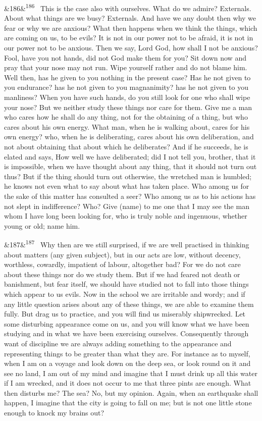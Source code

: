 \documentclass[12pt]{article}
\newcommand{\para}[1][]{\par\noindent\ifx&#1&\else\textsuperscript{\footnotesize #1}~\fi}
\begin{document}
\para[186] This is the case also with ourselves. What do we admire? Externals. About what things are we busy? Externals. And have we any doubt then why we fear or why we are anxious? What then happens when we think the things, which are coming on us, to be evils? It is not in our power not to be afraid, it is not in our power not to be anxious. Then we say, Lord God, how shall I not be anxious? Fool, have you not hands, did not God make them for you? Sit down now and pray that your nose may not run. Wipe yourself rather and do not blame him. Well then, has he given to you nothing in the present case? Has he not given to you endurance? has he not given to you magnanimity? has he not given to you manliness? When you have such hands, do you still look for one who shall wipe your nose? But we neither study these things nor care for them. Give me a man who cares how he shall do any thing, not for the obtaining of a thing, but who cares about his own energy. What man, when he is walking about, cares for his own energy? who, when he is deliberating, cares about his own deliberation, and not about obtaining that about which he deliberates? And if he succeeds, he is elated and says, How well we have deliberated; did I not tell you, brother, that it is impossible, when we have thought about any thing, that it should not turn out thus? But if the thing should turn out otherwise, the wretched man is humbled; he knows not even what to say about what has taken place. Who among us for the sake of this matter has consulted a seer? Who among us as to his actions has not slept in indifference? Who? Give (name) to me one that I may see the man whom I have long been looking for, who is truly noble and ingenuous, whether young or old; name him.

\para[187] Why then are we still surprised, if we are well practised in thinking about matters (any given subject), but in our acts are low, without decency, worthless, cowardly, impatient of labour, altogether bad? For we do not care about these things nor do we study them. But if we had feared not death or banishment, but fear itself, we should have studied not to fall into those things which appear to us evils. Now in the school we are irritable and wordy; and if any little question arises about any of these things, we are able to examine them fully. But drag us to practice, and you will find us miserably shipwrecked. Let some disturbing appearance come on us, and you will know what we have been studying and in what we have been exercising ourselves. Consequently through want of discipline we are always adding something to the appearance and representing things to be greater than what they are. For instance as to myself, when I am on a voyage and look down on the deep sea, or look round on it and see no land, I am out of my mind and imagine that I must drink up all this water if I am wrecked, and it does not occur to me that three pints are enough. What then disturbs me? The sea? No, but my opinion. Again, when an earthquake shall happen, I imagine that the city is going to fall on me; but is not one little stone enough to knock my brains out?
\end{document}
